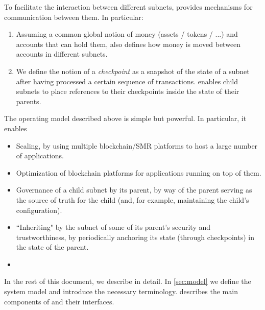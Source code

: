 To facilitate the interaction between different subnets, \ipc provides mechanisms for communication between them.
In particular:
\begin{enumerate}
    \item Assuming a common global notion of money (assets / tokens / ...) and accounts that can hold them, \ipc also defines how money is moved between accounts in different subnets.
    \item We define the notion of a \emph{checkpoint} as a snapshot of the state of a subnet after having processed a certain sequence of transactions.
    \ipc enables child subnets to place references to their checkpoints inside the state of their parents.
\end{enumerate}

The operating model described above is simple but powerful.
In particular, it enables
\begin{itemize}
    \item Scaling, by using multiple blockchain/SMR platforms to host a large number of applications.
    \item Optimization of blockchain platforms for applications running on top of them.
    \item Governance of a child subnet by its parent, by way of the parent serving as the source of truth for the child (and, for example, maintaining the child's configuration).
    \item ``Inheriting" by the subnet of some of its parent's security and trustworthiness, by periodically anchoring its state (through checkpoints) in the state of the parent.
    \item {}
\end{itemize}

In the rest of this document, we describe \ipc in detail.
In \cref{sec:model} we define the system model and introduce the necessary terminology.
 describes the main components of \ipc and their interfaces.
